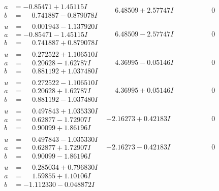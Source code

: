 \documentclass[1p]{elsarticle_modified}
\theoremstyle{definition}
\begin{document}
$$\begin{array}{c|c|c}
\begin{aligned}
a &= -0.85471 + 1.45115 I \\
b &= \phantom{-}0.741887 - 0.879078 I\end{aligned}
 & \phantom{-}6.48509 + 2.57747 I & \phantom{-0.000000 } 0 \\ \hline\begin{aligned}
u &= \phantom{-}0.001943 - 1.137920 I \\
a &= -0.85471 - 1.45115 I \\
b &= \phantom{-}0.741887 + 0.879078 I\end{aligned}
 & \phantom{-}6.48509 - 2.57747 I & \phantom{-0.000000 } 0 \\ \hline\begin{aligned}
u &= \phantom{-}0.272522 + 1.106510 I \\
a &= \phantom{-}0.20628 - 1.62787 I \\
b &= \phantom{-}0.881192 + 1.037480 I\end{aligned}
 & \phantom{-}4.36995 - 0.05146 I & \phantom{-0.000000 } 0 \\ \hline\begin{aligned}
u &= \phantom{-}0.272522 - 1.106510 I \\
a &= \phantom{-}0.20628 + 1.62787 I \\
b &= \phantom{-}0.881192 - 1.037480 I\end{aligned}
 & \phantom{-}4.36995 + 0.05146 I & \phantom{-0.000000 } 0 \\ \hline\begin{aligned}
u &= \phantom{-}0.497843 + 1.035330 I \\
a &= \phantom{-}0.62877 - 1.72907 I \\
b &= \phantom{-}0.90099 + 1.86196 I\end{aligned}
 & -2.16273 + 0.42183 I & \phantom{-0.000000 } 0 \\ \hline\begin{aligned}
u &= \phantom{-}0.497843 - 1.035330 I \\
a &= \phantom{-}0.62877 + 1.72907 I \\
b &= \phantom{-}0.90099 - 1.86196 I\end{aligned}
 & -2.16273 - 0.42183 I & \phantom{-0.000000 } 0 \\ \hline\begin{aligned}
u &= \phantom{-}0.285034 + 0.796830 I \\
a &= \phantom{-}1.59855 + 1.10106 I \\
b &= -1.112330 - 0.048872 I\end{aligned}

\end{array}$$
\end{document}
